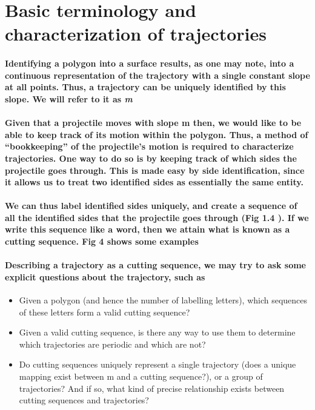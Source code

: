 \documentclass{article}
\begin{document}

\section{Basic terminology and characterization of trajectories}
\paragraph{Identifying a polygon into a surface results, as one may note, into a continuous representation of the trajectory with a single constant slope at all points. Thus, a trajectory can be uniquely identified by this slope. We will refer to it as \textit{m}}

\paragraph{Given that a projectile moves with slope m then, we would like to be able to keep track of its motion within the polygon. Thus, a method of “bookkeeping” of the projectile’s motion is required to characterize trajectories. One way to do so is by keeping track of which sides the projectile goes through. This is made easy by side identification, since it allows us to treat two identified sides as essentially the same entity.}

\paragraph{We can thus label identified sides uniquely, and create a sequence of all the identified sides that the projectile goes through (Fig 1.4 ). If we write this sequence like a word, then we attain what is known as a cutting sequence. Fig 4 shows some examples}


\paragraph{Describing a trajectory as a cutting sequence, we may try to ask some explicit questions about the trajectory, such as}

\begin{itemize}
\item Given a polygon (and hence the number of labelling letters), which sequences of these letters form a valid cutting sequence?

\item Given a valid cutting sequence, is there any way to use them to determine which trajectories are periodic and which are not?

\item Do cutting sequences uniquely represent a single trajectory (does a unique mapping exist between m and a cutting sequence?), or a group of trajectories? And if so, what kind of precise relationship exists between cutting sequences and trajectories?

\end{itemize}
\end{document}

